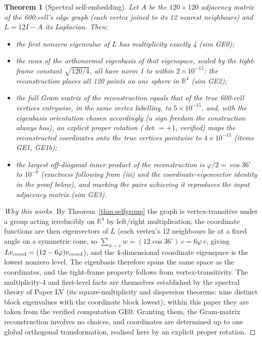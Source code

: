 \documentclass[12pt]{article}
\newtheorem{theorem}{Theorem}
\theoremstyle{definition}
\theoremstyle{remark}
\begin{document}
\begin{theorem}[Spectral self-embedding]\label{thm:embed}
Let $A$ be the $120\times120$ adjacency matrix of the 600-cell's edge graph (each vertex joined to its 12 nearest neighbours) and $L = 12I - A$ its Laplacian. Then:
\begin{itemize}
\item[(i)] the first nonzero eigenvalue of $L$ has multiplicity exactly 4 (sim GE0);
\item[(ii)] the rows of the orthonormal eigenbasis of that eigenspace, scaled by the tight-frame constant $\sqrt{120/4}$, all have norm 1 to within $2\times10^{-15}$: the reconstruction places all 120 points on one sphere in $\mathbb R^4$ (sim GE2);
\item[(iii)] the \emph{full} Gram matrix of the reconstruction equals that of the true 600-cell vertices entrywise, in the same vertex labelling, to $5\times10^{-15}$, and, with the eigenbasis orientation chosen accordingly (a sign freedom the construction always has), an explicit proper rotation ($\det = +1$, verified) maps the reconstructed coordinates onto the true vertices pointwise to $4\times10^{-15}$ (items GE1, GE1b);
\item[(iv)] the largest off-diagonal inner product of the reconstruction is $\varphi/2 = \cos 36^\circ$ to $10^{-9}$ (exactness following from (iii) and the coordinate-eigenvector identity in the proof below), and marking the pairs achieving it reproduces the input adjacency matrix (sim GE3).
\end{itemize}
\end{theorem}

\begin{proof}[Why this works]
By Theorem~\ref{thm:selfgroup} the graph is vertex-transitive under a group acting irreducibly on $\mathbb R^4$ by left/right multiplication; the coordinate functions are then eigenvectors of $L$ (each vertex's 12 neighbours lie at a fixed angle on a symmetric cone, so $\sum_{w\sim v} w = (12\cos 36^\circ)\,v = 6\varphi\, v$, giving $L v_{\rm coord} = (12 - 6\varphi)v_{\rm coord}$), and the 4-dimensional coordinate eigenspace is the lowest nonzero level. The eigenbasis therefore spans the same space as the coordinates, and the tight-frame property follows from vertex-transitivity. The multiplicity-4 and first-level facts are themselves established by the spectral theory of Paper LV (its square-multiplicity and dispersion theorems: nine distinct block eigenvalues with the coordinate block lowest); within this paper they are taken from the verified computation GE0. Granting them, the Gram-matrix reconstruction involves no choices, and coordinates are determined up to one global orthogonal transformation, realised here by an explicit proper rotation.
\end{proof}
\end{document}
